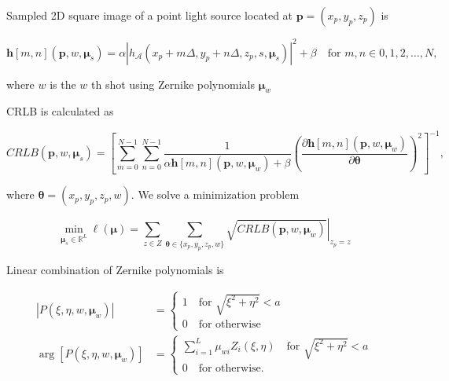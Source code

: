 \documentclass[letter, 11pt]{article}
\begin{document}
Sampled 2D square image of a point light source located at $\mathbf{p} = (x_{p}, y_{p}, z_{p})$ is

\begin{equation}
	\mathbf{h}[m, n](\mathbf{p}, w, \boldsymbol{\mu}_{s}) = \alpha \left|   h_{\mathcal{A}} (x_{p} + m \Delta,  y_{p} + n \Delta, z_{p}, 
	s, \boldsymbol{\mu}_{s})    \right|^{2} + \beta \quad  \text{for } m, n \in {0, 1, 2, \ldots, N},
\end{equation}

\noindent where $w$ is the $w$ th  shot using Zernike polynomials $\boldsymbol{\mu}_{w}$

CRLB is calculated as

\begin{equation}
	CRLB(\mathbf{p}, w, \boldsymbol{\mu}_{s}) = \left[   \sum_{m=0}^{N-1} \sum_{n=0}^{N-1}
	\frac{1}{\alpha \mathbf{h} [m, n] (\mathbf{p}, w, \boldsymbol{\mu}_{w}) + \beta}	    
	\left(  \frac{\partial  \mathbf{h}[m, n] (\mathbf{p}, w, \boldsymbol{\mu}_{w})}{\partial \boldsymbol{\theta}} \right) ^{2}
	\right]^{-1},
\end{equation}

\noindent
where $\boldsymbol{\theta} = (x_{p}, y_{p}, z_{p}, w)$. 
We solve a minimization problem


\begin{equation}
	\min_{\boldsymbol{\mu}_{s} \in \mathbb{R}^{L}} \ell (\boldsymbol{\mu}) = 
	\sum_{z \in Z} \sum_{\boldsymbol{\theta} \in \{ x_{p}, y_{p}, z_{p}, w \} }
	\left. \sqrt{CRLB(\mathbf{p}, w, \boldsymbol{\mu}_{w})}
	\right|_{z_{p} = z}
\end{equation}

\noindent
Linear combination of Zernike polynomials is

\begin{align*}
	| P(\xi, \eta, w, \boldsymbol{\mu}_{w}) | &=
		\begin{cases}
			1 \quad \text{for } \sqrt{\xi^{2} + \eta^{2}} < a \\
			0 \quad \text{for otherwise}
	        \end{cases} \\
	        \arg [ P(\xi, \eta, w, \boldsymbol{\mu}_{w}) ] &=
		        \begin{cases}
	        		\sum_{i = 1}^{L} \mu_{wi} Z_{i} (\xi, \eta) \quad \text{for } \sqrt{\xi^{2} + \eta^{2}} < a \\
			0 \quad \text{for otherwise}.
	        \end{cases}
\end{align*}
\end{document}

